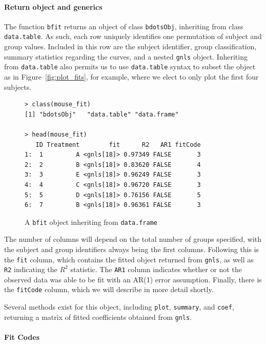 \documentclass{article}
\newcommand{\xt}{\texttt}%
\begin{document}
\paragraph{Return object and generics}


The function \texttt{bfit} returns an object of class \texttt{bdotsObj}, inheriting from class \texttt{data.table}. As such, each row uniquely identifies one permutation of subject and group values. Included in this row are the subject identifier, group classification, summary statistics regarding the curves, and a nested \xt{gnls} object. Inheriting from \xt{data.table} also permits us to use \xt{data.table} syntax to subset the object as in Figure~\ref{fig:plot_fits}, for example, where we elect to only plot the first four subjects.

\begin{singlespace}
\begin{figure}[H]
\centering
\begin{BVerbatim}
> class(mouse_fit)
[1] "bdotsObj"   "data.table" "data.frame"

> head(mouse_fit)
   ID Treatment        fit      R2   AR1 fitCode
1:  1         A <gnls[18]> 0.97349 FALSE       3
2:  2         B <gnls[18]> 0.83620 FALSE       4
3:  3         E <gnls[18]> 0.96249 FALSE       3
4:  4         C <gnls[18]> 0.96720 FALSE       3
5:  5         D <gnls[18]> 0.76156 FALSE       5
6:  7         B <gnls[18]> 0.96361 FALSE       3
\end{BVerbatim}
\caption{A \xt{bfit} object inheriting from \xt{data.frame}}
\label{fig:bdotsObj}
\end{figure}
\end{singlespace}

The number of columns will depend on the total number of groups specified, with the subject and group identifiers always being the first columns. Following this is the \xt{fit} column, which contains the fitted object returned from \xt{gnls}, as well as \xt{R2} indicating the $R^2$ statistic. The \xt{AR1} column indicates whether or not the observed data was able to be fit with an AR(1) error assumption. Finally, there is the \xt{fitCode} column, which we will describe in more detail shortly.

Several methods exist for this object, including \texttt{plot}, \texttt{summary}, and \texttt{coef}, returning a matrix of fitted coefficients obtained from \texttt{gnls}. 


\paragraph{Fit Codes}\label{sec:fitcode}
\end{document}
